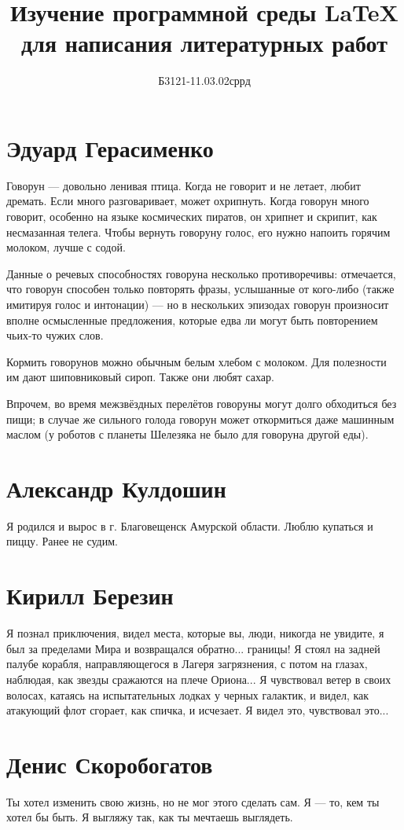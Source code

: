 \documentclass[labwork]{fefudoc}
\author{Б3121-11.03.02сррд}{Эдуард Герасименко}
\title{Изучение программной среды \LaTeX{} для написания литературных работ}
\begin{document}
\frontpage
\tableofcontents

\section{Эдуард Герасименко}
Говорун — довольно ленивая птица. Когда не говорит и не летает, любит дремать. Если много разговаривает, может охрипнуть. Когда говорун много говорит, особенно на языке космических пиратов, он хрипнет и скрипит, как несмазанная телега. Чтобы вернуть говоруну голос, его нужно напоить горячим молоком, лучше с содой.

Данные о речевых способностях говоруна несколько противоречивы: отмечается, что говорун способен только повторять фразы, услышанные от кого-либо (также имитируя голос и интонации) — но в нескольких эпизодах говорун произносит вполне осмысленные предложения, которые едва ли могут быть повторением чьих-то чужих слов.

Кормить говорунов можно обычным белым хлебом с молоком. Для полезности им дают шиповниковый сироп. Также они любят сахар.

Впрочем, во время межзвёздных перелётов говоруны могут долго обходиться без пищи; в случае же сильного голода говорун может откормиться даже машинным маслом (у роботов с планеты Шелезяка не было для говоруна другой еды).



\section{Александр Кулдошин}
Я родился и вырос в г. Благовещенск Амурской области. Люблю купаться и пиццу. Ранее не судим.
\section{Кирилл Березин}
Я познал приключения, видел места, которые вы, люди, никогда не увидите, я был за пределами Мира и возвращался обратно... границы! 
Я стоял на задней палубе корабля, направляющегося в Лагеря загрязнения, с потом на глазах, наблюдая, как звезды сражаются на плече Ориона... 
Я чувствовал ветер в своих волосах, катаясь на испытательных лодках у черных галактик, и видел, как атакующий флот сгорает, как спичка, и исчезает. 
Я видел это, чувствовал это...
\section{Денис Скоробогатов}
Ты хотел изменить свою жизнь, но не мог этого сделать сам. Я — то, кем ты хотел бы быть. Я выгляжу так, как ты мечтаешь выглядеть. 
\end{document}
